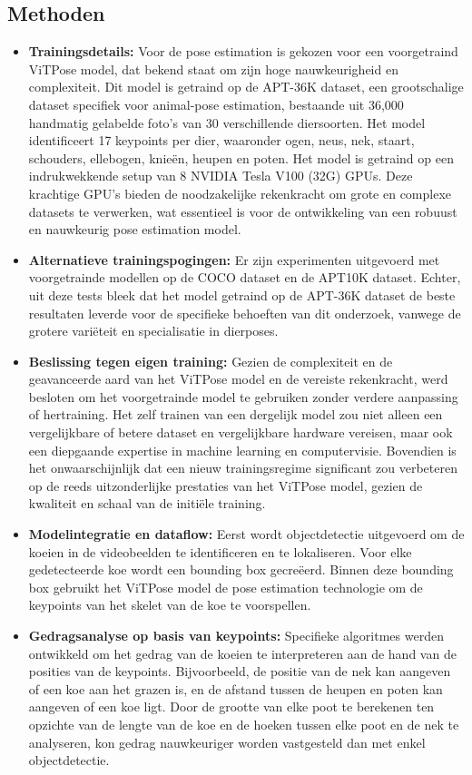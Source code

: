 \subsection{Methoden}
\begin{itemize}
  \item \textbf{Trainingsdetails:} Voor de pose estimation is gekozen voor een voorgetraind ViTPose model, dat bekend staat om zijn hoge nauwkeurigheid en complexiteit. Dit model is getraind op de APT-36K dataset, een grootschalige dataset specifiek voor animal-pose estimation, bestaande uit 36,000 handmatig gelabelde foto's van 30 verschillende diersoorten. Het model identificeert 17 keypoints per dier, waaronder ogen, neus, nek, staart, schouders, ellebogen, knieën, heupen en poten. Het model is getraind op een indrukwekkende setup van 8 NVIDIA Tesla V100 (32G) GPUs. Deze krachtige GPU's bieden de noodzakelijke rekenkracht om grote en complexe datasets te verwerken, wat essentieel is voor de ontwikkeling van een robuust en nauwkeurig pose estimation model.
  \item \textbf{Alternatieve trainingspogingen:} Er zijn experimenten uitgevoerd met voorgetrainde modellen op de COCO dataset en de APT10K dataset. Echter, uit deze tests bleek dat het model getraind op de APT-36K dataset de beste resultaten leverde voor de specifieke behoeften van dit onderzoek, vanwege de grotere variëteit en specialisatie in dierposes.
  \item \textbf{Beslissing tegen eigen training:} Gezien de complexiteit en de geavanceerde aard van het ViTPose model en de vereiste rekenkracht, werd besloten om het voorgetrainde model te gebruiken zonder verdere aanpassing of hertraining. Het zelf trainen van een dergelijk model zou niet alleen een vergelijkbare of betere dataset en vergelijkbare hardware vereisen, maar ook een diepgaande expertise in machine learning en computervisie. Bovendien is het onwaarschijnlijk dat een nieuw trainingsregime significant zou verbeteren op de reeds uitzonderlijke prestaties van het ViTPose model, gezien de kwaliteit en schaal van de initiële training.
  \item \textbf{Modelintegratie en dataflow:} Eerst wordt objectdetectie uitgevoerd om de koeien in de videobeelden te identificeren en te lokaliseren. Voor elke gedetecteerde koe wordt een bounding box gecreëerd. Binnen deze bounding box gebruikt het ViTPose model de pose estimation technologie om de keypoints van het skelet van de koe te voorspellen.
  \item \textbf{Gedragsanalyse op basis van keypoints:} Specifieke algoritmes werden ontwikkeld om het gedrag van de koeien te interpreteren aan de hand van de posities van de keypoints. Bijvoorbeeld, de positie van de nek kan aangeven of een koe aan het grazen is, en de afstand tussen de heupen en poten kan aangeven of een koe ligt. Door de grootte van elke poot te berekenen ten opzichte van de lengte van de koe en de hoeken tussen elke poot en de nek te analyseren, kon gedrag nauwkeuriger worden vastgesteld dan met enkel objectdetectie.
\end{itemize}

